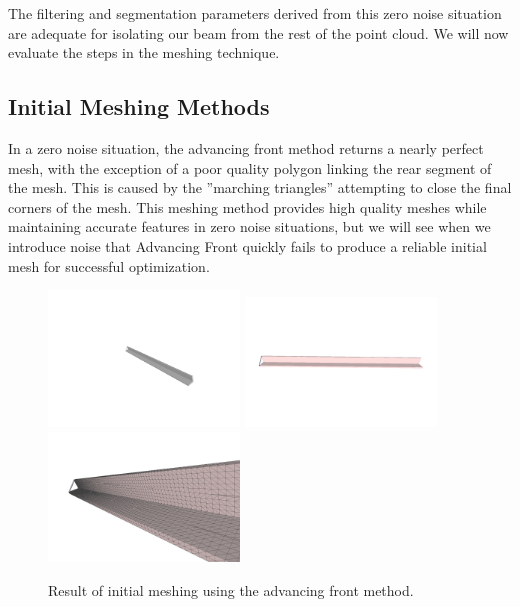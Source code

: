 \documentclass[12pt]{drexelthesis}
\let\Oldsubsection\subsection
\renewcommand{\subsection}{\FloatBarrier\Oldsubsection}
\begin{document}
The filtering and segmentation parameters derived from this zero noise situation are adequate for isolating our beam from the rest of the point cloud. We will now evaluate the steps in the meshing technique.


\subsection{Initial Meshing Methods}
In a zero noise situation, the advancing front method returns a nearly perfect mesh, with the exception of a poor quality polygon linking the rear segment of the mesh. This is caused by the ''marching triangles'' attempting to close the final corners of the mesh. This meshing method provides high quality meshes while maintaining accurate features in zero noise situations, but we will see when we introduce noise that Advancing Front quickly fails to produce a reliable initial mesh for successful optimization.

\begin{figure}[!ht]
	
	\centering
		\includegraphics[trim={5in 2in 3in 3in},clip,width=2in]{simulated-lab-scan/0noise/clean/advancingfront.png}
		\includegraphics[trim={0 3in 0 3in},clip,width=2in]{simulated-lab-scan/0noise/clean/advancingfront01.png}
		\includegraphics[width=2in]{simulated-lab-scan/0noise/clean/advancingfront02.png}
		\caption[Initial meshing using a raw advancing front approach]{\centering  Result of initial meshing using the advancing front method.}
		\label{zeronoise:advancingfront}
\end{figure}
\end{document}
